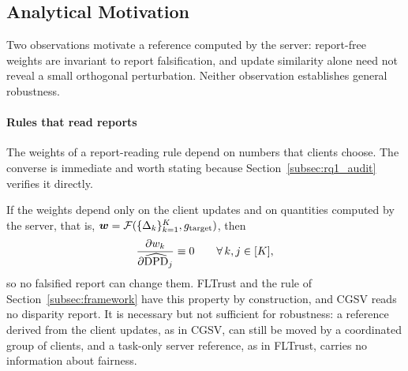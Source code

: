 \subsection{Analytical Motivation}
\label{subsec:theory}

Two observations motivate a reference computed by the server: report-free weights are invariant to report falsification, and update similarity alone need not reveal a small orthogonal perturbation. Neither observation establishes general robustness.

\paragraph{Rules that read reports}
\label{subsubsec:theory_immunity}

The weights of a report-reading rule depend on numbers that clients choose. The converse is immediate and worth stating because Section~\ref{subsec:rq1_audit} verifies it directly.

\begin{remark}
\label{prop:syntactic_immunity}
If the weights depend only on the client updates and on quantities computed by the server, that is, $\bm{w} = \mathcal{F}(\{\Delta_k\}_{k=1}^K, g_{\mathrm{target}})$, then
\begin{equation}
\label{eq:zero_deriv}
\frac{\partial w_k}{\partial \widehat{\mathrm{DPD}}_j} \equiv 0 \qquad \forall\, k, j \in [K],
\end{equation}
so no falsified report can change them. FLTrust and the rule of Section~\ref{subsec:framework} have this property by construction, and CGSV reads no disparity report. It is necessary but not sufficient for robustness: a reference derived from the client updates, as in CGSV, can still be moved by a coordinated group of clients, and a task-only server reference, as in FLTrust, carries no information about fairness.
\end{remark}

